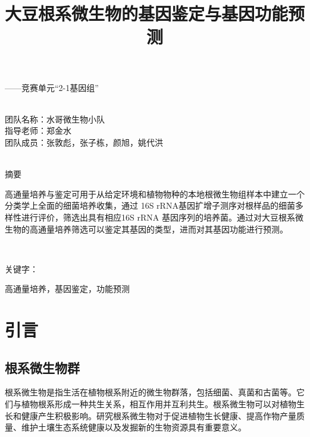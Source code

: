 \documentclass{ctexart}
\author{}
\date{}
\title{\vspace*{-1.5cm} \CJKfontspec{SimHei}大豆根系微生物的基因鉴定与基因功能预测}
\begin{document}
    \maketitle\thispagestyle{fancy}
    \vspace*{-1.5cm}

    \raggedleft
    { \heiti  ——竞赛单元“2-1基因组”}

    ~\\

    \raggedleft
        团队名称：水哥微生物小队\\
        指导老师：郑金水\\
        团队成员：张敦彪，张子栋，颜旭，姚代洪\\
    
    ~\\

    \raggedright
    { \heiti 摘要}

    { \qquad 高通量培养与鉴定\textsuperscript{\cite{ref1}}可用于从给定环境和植物物种的本地根微生物组样本中建立一个分类学上全面的细菌培养收集，通过 16S rRNA基因扩增子测序对根样品的细菌多样性进行评价，筛选出具有相应16S rRNA 基因序列的培养菌。通过对大豆根系微生物的高通量培养筛选可以鉴定其基因的类型，进而对其基因功能进行预测。}
    
    ~\\

    {\heiti {} \raggedright 关键字：} { 高通量培养，基因鉴定，功能预测}

    




    \section{引言}

    \subsection{根系微生物群}

    \qquad 根系微生物是指生活在植物根系附近的微生物群落，包括细菌、真菌和古菌等。它们与植物根系形成一种共生关系，相互作用并互利共生。根系微生物可以对植物生长和健康产生积极影响。研究根系微生物对于促进植物生长健康、提高作物产量质量、维护土壤生态系统健康以及发掘新的生物资源具有重要意义。
\end{document}
